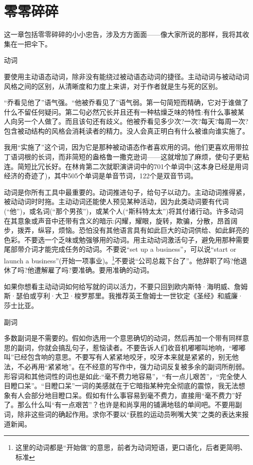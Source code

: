 \chapter{零零碎碎}
这一章包括零零碎碎的小小忠告，涉及方方面面——像大家所说的那样，我将其收集在一把伞下。

动词

要使用主动语态动词，除非没有能绕过被动语态动词的捷径。主动动词与被动动词风格之间的区别，从清晰度和力度上来讲，对于作者就是生与死的区别。

“乔看见他了”语气强。“他被乔看见了”语气弱。第一句简短而精确，它对于谁做了什么不留任何疑问。第二句必然冗长并且还有一种枯燥乏味的特性:有什么事被某人向另一个人做了。而且该句还有歧义。他被乔看见多少次?一次?每天?每周一次?包含被动结构的风格会消耗读者的精力。没人会真正明白有什么被谁向谁实施了。

我用“实施了”这个词，因为它是那种被动语态作者喜欢用的词。他们更喜欢用带拉丁语词根的长词，而非简短的盎格鲁一撒克逊词——这就增加了麻烦，使句子更粘连。简短比冗长好。在林肯第二次就职演讲词中的701个单词中(这本身已经是用词经济的奇迹了)，其中505个单词是单音节词，122个是双音节词。

动词是你所有工具中最重要的。动词推进句子，给句子以动力。主动动词推得紧，被动动词时时拖。主动动词还能使人预见某种活动，因为此类动词要有代词(“他”)，或名词(“那个男孩”)，或某个人(“斯科特太太”)将其付诸行动。许多动词在其意象或声音中还带有含义的暗示:闪耀，耀眼，旋转，欺骗，分散，昂首阔步，拨弄，纵容，烦恼。恐怕没有其他语言具有如此巨大的动词供给、如此鲜亮的色彩。不要选一个乏味或勉强够用的动词。用主动动词激活句子，避免用那种需要尾部带介词才能完成任务的动词。不要说“set up a business”，可以说“start or launch a business”(开始一项事业)。\footnote{这里的动词都是“开始做”的意思，前者为动词短语，更口语化，后者更简明、标准}不要说“公司总裁下台了”。他辞职了吗?他退休了吗?他遭解雇了吗?要准确。要用准确的动词。

如果你想看主动动词如何给写就的词以活力，不要只回到欧内斯特·海明威、詹姆斯·瑟伯或亨利·大卫·梭罗那里。我推荐英王詹姆士一世钦定《圣经》和威廉·莎士比亚。

副词

多数副词是不需要的。假如你选用一个意思确切的动词，然后再加一个带有同样意思的副词，你就会搞乱句子，惹恼读者。不要告诉人们收音机嘟嘟叫地响，“嘟嘟叫”已经包含响的意思。不要写有人紧紧地咬牙，咬牙本来就是紧紧的，别无他法，不必再用“紧紧地”。在不经意的写作中，强力动词反复被多余的副词所削弱。形容词和其他词性的词也是如此:“毫不费力地容易”，“有一点儿艰苦”，“完全使人目瞪口呆”。“目瞪口呆”一词的美感就在于它暗指某种完全彻底的震惊，我无法想象有人会部分地目瞪口呆。假如有什么事容易到毫不费力，直接用“毫不费力”好了。那么什么叫“有一点艰苦”？也许是和尚享用的铺满地毯的单间吧。不要用副词，除非这些词的确起作用。求你不要以“获胜的运动员咧嘴大笑”之类的表达来报道新闻。


